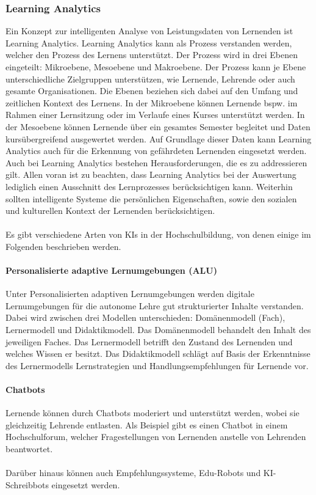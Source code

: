 \subsubsection*{Learning Analytics}
Ein Konzept zur intelligenten Analyse von Leistungsdaten von Lernenden ist Learning Analytics.
Learning Analytics kann als Prozess verstanden werden, welcher den Prozess des Lernens unterstützt.
Der Prozess wird in drei Ebenen eingeteilt: Mikroebene, Mesoebene und Makroebene.
Der Prozess kann je Ebene unterschiedliche Zielgruppen unterstützen, wie Lernende, Lehrende oder auch gesamte Organisationen.
Die Ebenen beziehen sich dabei auf den Umfang und zeitlichen Kontext des Lernens.
In der Mikroebene können Lernende bspw. im Rahmen einer Lernsitzung oder im Verlaufe eines Kurses unterstützt werden.
In der Mesoebene können Lernende über ein gesamtes Semester begleitet und Daten kursübergreifend ausgewertet werden.
Auf Grundlage dieser Daten kann Learning Analytics auch für die Erkennung von gefährdeten Lernenden eingesetzt werden. \cite*[S. 14ff]{Witt.2020}
\\ \noindent
Auch bei Learning Analytics bestehen Herausforderungen, die es zu addressieren gilt.
Allen voran ist zu beachten, dass Learning Analytics bei der Auswertung lediglich einen Ausschnitt des Lernprozesses berücksichtigen kann.
Weiterhin sollten intelligente Systeme die persönlichen Eigenschaften, sowie den sozialen und kulturellen Kontext der Lernenden berücksichtigen. \cite*[S. 16]{Witt.2020}
\\ \\ \noindent
Es gibt verschiedene Arten von KIs in der Hochschulbildung, von denen einige im Folgenden beschrieben werden.

\paragraph*{Personalisierte adaptive Lernumgebungen (ALU)}
Unter Personalisierten adaptiven Lernumgebungen werden digitale Lernumgebungen für die autonome Lehre gut strukturierter Inhalte verstanden.
Dabei wird zwischen drei Modellen unterschieden: Domänenmodell (Fach), Lernermodell und Didaktikmodell.
Das Domänenmodell behandelt den Inhalt des jeweiligen Faches.
Das Lernermodell betrifft den Zustand des Lernenden und welches Wissen er besitzt.
Das Didaktikmodell schlägt auf Basis der Erkenntnisse des Lernermodells Lernstrategien und Handlungsempfehlungen für Lernende vor. \cite*[S. 17f]{Witt.2020}
\paragraph*{Chatbots}
Lernende können durch Chatbots moderiert und unterstützt werden, wobei sie gleichzeitig Lehrende entlasten. Als Beispiel gibt es einen Chatbot in einem Hochschulforum, welcher Fragestellungen von Lernenden anstelle von Lehrenden beantwortet. \cite*[S. 18ff]{Witt.2020}
\\ \\ \noindent
Darüber hinaus können auch Empfehlungssysteme, Edu-Robots und KI-Schreibbots eingesetzt werden. \cite*[S. 18-21]{Witt.2020}
